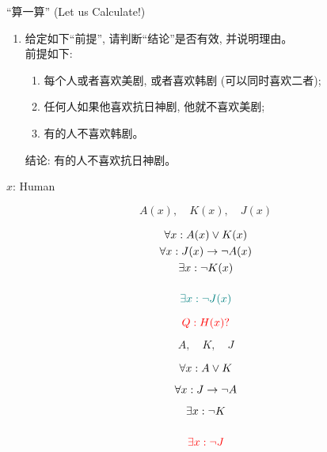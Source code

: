 \begin{frame}{}
  \begin{exampleblock}{``算一算'' (Let us Calculate!)}	
    \begin{enumerate}[(1)]
      \item 给定如下``前提'', 请判断``结论''是否有效, 并说明理由。\\
	前提如下:

	\begin{enumerate}[(1)]
	  \item 每个人或者喜欢美剧, 或者喜欢韩剧 (可以同时喜欢二者);
	  \item 任何人如果他喜欢抗日神剧, 他就不喜欢美剧;
	  \item 有的人不喜欢韩剧。
	\end{enumerate}
	结论: 有的人不喜欢抗日神剧。
    \end{enumerate}
  \end{exampleblock}
\end{frame}

\begin{frame}{}
  \centerline{$x$: Human}

  \[
    A(x),\quad K(x),\quad J(x)
  \]

  \pause
  \setlength{\jot}{1.5ex}
  \begin{gather}
    \setcounter{equation}{0}
    \forall x: A(x) \lor K(x) \\
    \forall x: J(x) \to \lnot A(x) \\
    \exists x: \lnot K(x) \\[3ex]
    \teal{\exists x: \lnot J(x)}
  \end{gather}

  \pause
  \[
    \textcolor{red}{Q: H(x)?}
  \]
\end{frame}

\begin{frame}{}
  \[
    A,\quad K,\quad J
  \]

  \begin{gather}
    \setcounter{equation}{0}
    \forall x: A \lor K \\[1ex]
    \forall x: J \to \lnot A \\[1ex]
    \exists x: \lnot K \\[3ex]
    \red{\exists x: \lnot J}
  \end{gather}
\end{frame}
